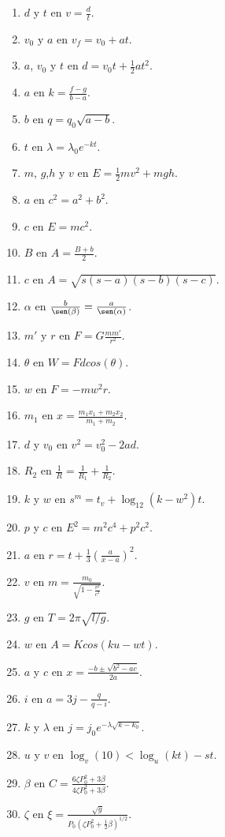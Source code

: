 \documentclass[a5paper,pagesize,10pt,bibtotoc,pointlessnumbers,
normalheadings,DIV=9,fleqn,x11names,table,twoside=false]{scrbook}
\begin{document}
\begin{enumerate}
 \item $d$ y $t$ en $v = \frac{d}{t}$.
 \item $v_0$ y $a$ en $v_f = v_0 + at$.
 \item $a$, $v_{0}$ y $t$ en $d = v_{0} t + \frac{1}{2} at^2$.
 \item $a$ en $k = \frac{f - g}{b - a}$.
 \item $b$ en $q = q_0 \sqrt{a-b}$.
 \item $t$ en $\lambda = \lambda_0 e^{-kt}$.
 \item $m$, $g$,$h$ y $v$ en $E = \frac{1}{2}mv^2 + mgh$.
 \item $a$ en $c^2 = a^2 + b^2$.
 \item $c$ en $E = mc^2$.
 \item $B$ en $A = \frac{B + b}{2}$.
 \item $c$ en $A = \sqrt{s(s-a)(s-b)(s-c)}$.
 \item $\alpha$ en $\frac{b}{\sen(\beta)}=\frac{a}{\sen(\alpha)}$.
 \item $m'$ y $r$ en $F = G\frac{mm'}{r^2}$.
 \item $\theta$ en $W = Fd cos(\theta)$.
 \item $w$ en $F = -mw^2r$.
 \item $m_1$ en $x = \frac{m_1x_1+m_2x_2}{m_1+m_2}$.
 \item $d$ y $v_0$ en $v^2 = v_0^2 -2ad$.
 \item $R_2$ en $\frac{1}{R} = \frac{1}{R_1} + \frac{1}{R_2}$.
 \item $k$ y $w$ en $s^m = t_v + \log_{12}(k-w^2)t$.
 \item $p$ y $c$ en $E^2 = m^2 c^4 + p^2c^2$.
 \item $a$ en $r = t +\frac{1}{3}(\frac{a}{x-a})^2$.
 \item $v$ en $m = \frac{m_0}{\sqrt{1-\frac{v^2}{c^2}}}$.
 \item $g$ en $T = 2\pi\sqrt{l/g}$.
 \item $w$ en $A = K cos(ku - wt)$.
 \item $a$ y $c$ en $x = \frac{-b \pm \sqrt{b^2-ac}}{2a}$.
 \item $i$ en $a = 3j - \frac{q}{q-i}$.
 \item $k$ y $\lambda$ en $j = j_0 e^{-\lambda\sqrt{k-k_0}}$.
 \item $u$ y $v$ en $\log_{v}(10) < \log_{u}(kt) - st$.
 \item $\beta$ en $C =  \frac{6\zeta P_0^2 + 3\beta}{4\zeta P_0^2 + 3\beta}$.
 \item $\zeta$ en $\xi = \frac{\sqrt{g}}{P_0\left( \zeta P_0^2+\frac{1}{2}\beta\right)^{1/2}}$.
 \end{enumerate}
\end{document}
